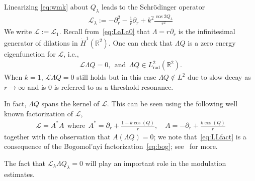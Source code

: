 \documentclass[10pt,reqno]{amsart}
\newcommand{\red}[1]{\textcolor{red}{#1}}
\newcommand{\LL}{\mathcal{L}}
\newcommand{\R}{\mathbb{R}}
\newcommand{\la}{\lambda}
\newcommand{\La}{\Lambda}
\newcommand{\p}{\partial}
\newcommand{\EQ}[1]{\begin{equation}\begin{split} #1 \end{split}\end{equation}}
\numberwithin{equation}{section}
\theoremstyle{remark}
\newcommand{\mwhere}{{\ \ \text{where} \ \ }}
\newcommand{\mand}{{\ \ \text{and} \ \  }}
\newcommand{\ula}{\underline{\lambda}}
\newcommand{\0}{\emptyset}
\begin{document}
Linearizing \eqref{eq:wmk} about $Q_\la$ leads to the Schr\"odinger operator
\EQ{
\LL_\la:= - \p_r^2 - \frac{1}{r} \p_r + k^2 \frac{\cos 2Q_\la}{r^2} 
}
We write $\LL := \LL_1$. Recall from~\eqref{eq:LaLa0} that $\La = r \p_r$ is the infinitesimal generator of dilations in $\dot{H}^1(\R^2)$. One can check that  $\La Q$ is a zero energy eigenfunction for  $\LL$, i.e., 
\EQ{
\LL \La Q = 0, \mand \La Q  \in L^2_{\textrm{rad}}(\R^2).
}
When $k=1$, $\LL \La Q = 0$ still holds but in this case $\La Q \not \in L^2$ due to slow decay as $r \to \infty$ and is $0$ is referred to as a threshold resonance.

In fact, $\La Q$ spans the kernel of $\LL$. This can be seen using the following well known factorization of $\LL$, 
\EQ{ \label{eq:LLfact} 
\LL = A^* A  \mwhere   A^* = \partial_r + \frac{1+k\cos (Q)}{r}, \quad A = - \partial_r + \frac{k\cos(Q)}{r}
}
together with the observation that  $A(\La Q) = 0$;  we note that~\eqref{eq:LLfact} is a consequence of the Bogomol'nyi factorization~\eqref{eq:bog}; see~\cite{RS, RR} for more.  

The fact that $\LL_\la \Lambda Q_\la = 0$ will play an important role in the modulation estimates.
\end{document}
